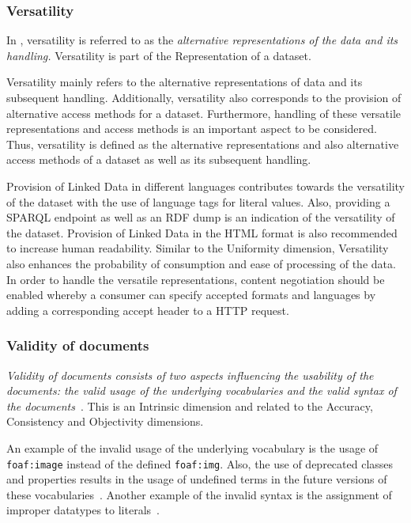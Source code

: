 \subsubsection{Versatility} 
In \cite{Flemming}, versatility is referred to as the \emph{alternative representations of the data and its handling.}
Versatility is part of the Representation of a dataset.

\begin{definition}[Versatility]
Versatility mainly refers to the alternative representations of data and its subsequent handling. 
Additionally, versatility also corresponds to the provision of alternative access methods for a dataset.
Furthermore, handling of these versatile representations and access methods is an important aspect to be considered. 
Thus, versatility is defined as the alternative representations and also alternative access methods of a dataset as well as its subsequent handling. 
\end{definition}

Provision of Linked Data in different languages contributes towards the versatility of the dataset with the use of language tags for literal values.
Also, providing a SPARQL endpoint as well as an RDF dump is an indication of the versatility of the dataset.
Provision of Linked Data in the HTML format is also recommended to increase human readability.  
Similar to the Uniformity dimension, Versatility also enhances the probability of consumption and ease of processing of the data.
In order to handle the versatile representations, content negotiation should be enabled whereby a consumer can specify accepted formats and languages by adding a corresponding accept header to a HTTP request. 

\subsubsection{Validity of documents}
\emph{Validity of documents consists of two aspects influencing the usability of the documents: the valid usage of the underlying vocabularies and the valid syntax of the documents}~\cite{Flemming}. 
This is an Intrinsic dimension and related to the Accuracy, Consistency and Objectivity dimensions.

An example of the invalid usage of the underlying vocabulary is the usage of \texttt{foaf:image} instead of the defined \texttt{foaf:img}. 
Also, the use of deprecated classes and properties results in the usage of undefined terms in the future versions of these vocabularies~\cite{Hogan}. 
Another example of the invalid syntax is the assignment of improper datatypes to literals~\cite{Hogan}.

